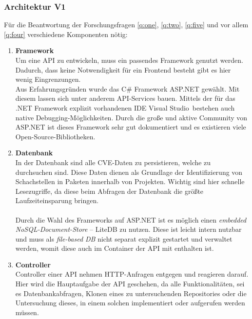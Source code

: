 \subsubsection{Architektur V1} \label{sec:Architektur}
    Für die Beantwortung der Forschungsfragen \ref{q:one}, \ref{q:two}, \ref{q:five} und vor allem \ref{q:four} verschiedene Komponenten nötig:
    \begin{enumerate}
        \item \textbf{Framework} \label{arch_1}\\
            Um eine \ac{API} zu entwickeln, muss ein passendes Framework genutzt werden.
            Dadurch, dass keine Notwendigkeit für ein Frontend besteht gibt es hier wenig Eingrenzungen.
            \\
            Aus Erfahrungsgründen wurde das C\# Framework ASP.NET gewählt.
            Mit diesem lassen sich unter anderem \ac{API}-Services bauen.
            Mittels der für das .NET Framework explizit vorhandenen IDE \glqq Visual Studio\grqq~bestehen auch native Debugging-Möglichkeiten.
            Durch die große und aktive Community von ASP.NET ist dieses Framework sehr gut dokumentiert und es existieren viele Open-Source-Bibliotheken.
        \item \textbf{Datenbank} \label{arch_2}\\
            In der Datenbank sind alle \ac{CVE}-Daten zu persistieren, welche zu durchsuchen sind.
            Diese Daten dienen als Grundlage der Identifizierung von Schachstellen in Paketen innerhalb von Projekten.
            Wichtig sind hier schnelle Lesezugriffe, da diese beim Abfragen der Datenbank die größte Laufzeiteinsparung bringen.
            \\ \\
            Durch die Wahl des Frameworks auf ASP.NET ist es möglich einen \textit{embedded NoSQL-Document-Store} -- LiteDB zu nutzen. %
            Diese ist leicht intern nutzbar und muss als \textit{file-based DB} nicht separat explizit gestartet und verwaltet werden, womit diese auch im Container der \ac{API} mit enthalten ist.
        \item \textbf{Controller} \label{arch_3}\\
            Controller einer \ac{API} nehmen HTTP-Anfragen entgegen und reagieren darauf.
            Hier wird die Hauptaufgabe der \ac{API} geschehen, da alle Funktionalitäten, sei es Datenbankabfragen, Klonen eines zu untersuchenden Repositories oder die Untersuchung dieses, in einem solchen implementiert oder aufgerufen werden müssen.

\end{enumerate}
